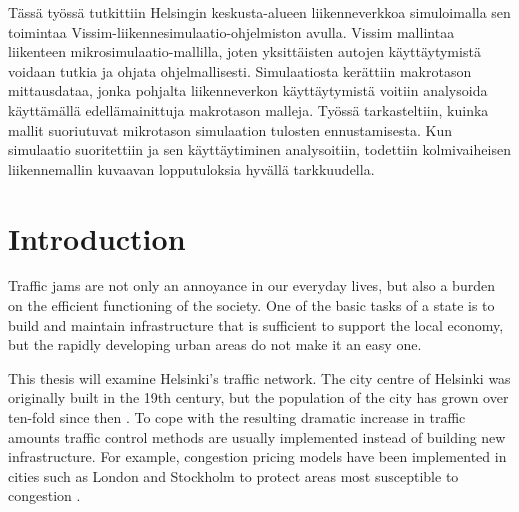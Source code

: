 \documentclass[english, 12pt, a4paper, elec, utf8, pdfa, online]{aaltothesis}
\newcommand{\pubdate}{11.5.2018}
\begin{document}
\begin{abstractpage}[finnish]
{    Tässä työssä tutkittiin Helsingin keskusta-alueen liikenneverkkoa simuloimalla sen toimintaa Vissim-liikennesimulaatio-ohjelmiston avulla. Vissim mallintaa liikenteen mikrosimulaatio-mallilla, joten yksittäisten autojen käyttäytymistä voidaan tutkia ja ohjata ohjelmallisesti. Simulaatiosta kerättiin makrotason mittausdataa, jonka pohjalta liikenneverkon käyttäytymistä voitiin analysoida käyttämällä edellämainittuja makrotason malleja. Työssä tarkasteltiin, kuinka mallit suoriutuvat mikrotason simulaation tulosten ennustamisesta. Kun simulaatio suoritettiin ja sen käyttäytiminen analysoitiin, todettiin kolmivaiheisen liikennemallin kuvaavan lopputuloksia hyvällä tarkkuudella.
    }

\end{abstractpage}

\newpage






\thesistableofcontents

\cleardoublepage

\section{Introduction}

\thispagestyle{empty}

Traffic jams are not only an annoyance in our everyday lives, but also a burden on the efficient functioning of the society. One of the basic tasks of a state is to build and maintain infrastructure that is sufficient to support the local economy, but the rapidly developing urban areas do not make it an easy one.

This thesis will examine Helsinki's traffic network. The city centre of Helsinki was originally built in the 19th century, but the population of the city has grown over ten-fold since then \cite{helsinki}. To cope with the resulting dramatic increase in traffic amounts traffic control methods are usually implemented instead of building new infrastructure. For example, congestion pricing models have been implemented in cities such as London and Stockholm to protect areas most susceptible to congestion \cite{congestionpricing}.
\end{document}
